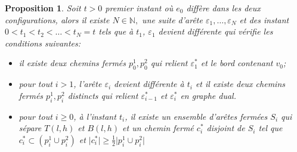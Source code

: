 \documentclass[titlepage,a4paper,12pt]{article}
\newcounter{prop}
\newtheorem{chaine}[prop]{Proposition}
\begin{document}
\begin{chaine}
\label{chaine}
Soit $t>0$ premier instant où $e_0$ diffère dans les deux configurations, alors il existe $N\in \mathbb{N},$ une suite d'arête $\varepsilon_1,\dots,\varepsilon_N$ et des instant $0<t_1< t_2<\dots<t_N=t$ tels que à $t_1$, $\varepsilon_1$ devient différente qui vérifie les conditions suivantes:

\begin{itemize}
\item[(i)] il existe deux chemins fermés $p_0^1,p_0^2$ qui relient $\varepsilon_1^*$ et le bord contenant $v_0$;

\item[(ii)] pour tout $i>1$, l'arête $\varepsilon_i$ devient différente à $t_i$ et il existe deux chemins fermés $p_i^1,p_i^2$ distincts qui relient $\varepsilon_{i-1}^*$ et $\varepsilon_i^*$ en graphe dual.

\item[(iii)] pour tout $i\geqslant 0$, à l'instant $t_i$, il existe un ensemble d'arêtes fermées $S_i$ qui sépare $T(l,h)$ et $B(l,h)$ et un chemin fermé $c^*_i$ disjoint de $S_i$ tel que $c_i^* \subset (p_i^1\cup p_i^2)$ et $\vert c_i^*\vert \geqslant \frac{1}{2} \vert p_i^1\cup p_i^2 \vert$
\end{itemize}

\end{chaine}
\end{document}
